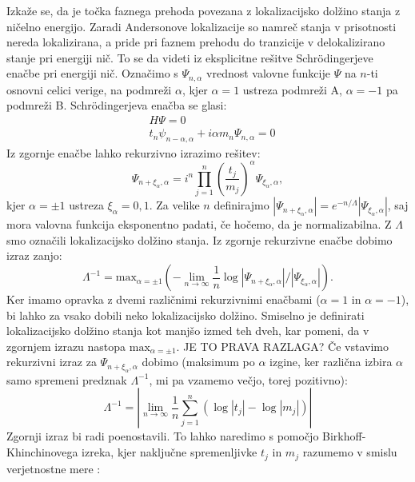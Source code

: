 Izkaže se, da je točka faznega prehoda povezana z lokalizacijsko dolžino stanja z ničelno energijo. Zaradi Andersonove lokalizacije so namreč stanja v prisotnosti nereda lokalizirana, a pride pri faznem prehodu do tranzicije v delokalizirano stanje pri energiji nič.
To se da videti iz eksplicitne rešitve Schrödingerjeve enačbe pri energiji nič.
Označimo s $\Psi_{n, \alpha}$ vrednost valovne funkcije $\Psi$ na $n$-ti osnovni celici verige, na podmreži $\alpha$, kjer $\alpha=1$ ustreza podmreži A, $\alpha=-1$ pa podmreži B.
Schrödingerjeva enačba se glasi:
\begin{align}
&H \Psi = 0 \\
&t_n \psi_{n-\alpha, \alpha} + i \alpha m_n \Psi_{n, \alpha} = 0
\end{align}
Iz zgornje enačbe lahko rekurzivno izrazimo rešitev:
\begin{equation}
\Psi_{n+\xi_\alpha, \alpha} = i^n \prod_{j=1}^n \left( \frac{t_j}{m_j} \right)^\alpha \Psi_{\xi_\alpha,\alpha},
\end{equation}
kjer $\alpha = \pm 1$ ustreza $\xi_\alpha = 0, 1$.
Za velike $n$ definirajmo $|\Psi_{n+\xi_\alpha, \alpha}| = e^{-n/\Lambda } |\Psi_{\xi_\alpha, \alpha}|$, saj mora valovna funkcija eksponentno padati, če hočemo, da je normalizabilna. Z $\Lambda$ smo označili lokalizacijsko dolžino stanja.
Iz zgornje rekurzivne enačbe dobimo izraz zanjo:
\begin{equation}
\Lambda^{-1} = \mathrm{max}_{\alpha = \pm 1} \left( - \lim_{n \to \infty} \frac{1}{n} \log |\Psi_{n+ \xi_\alpha, \alpha}| / |\Psi_{\xi_\alpha, \alpha}| \right).
\end{equation}
Ker imamo opravka z dvemi različnimi rekurzivnimi enačbami ($\alpha=1$ in $\alpha=-1$), bi lahko za vsako dobili neko lokalizacijsko dolžino. Smiselno je definirati lokalizacijsko dolžino stanja kot manjšo izmed teh dveh, kar pomeni, da v zgornjem izrazu nastopa $\mathrm{max}_{\alpha = \pm 1}$. JE TO PRAVA RAZLAGA? 
Če vstavimo rekurzivni izraz za $\Psi_{n+ \xi_\alpha, \alpha}$ dobimo (maksimum po $\alpha$ izgine, ker različna izbira $\alpha$ samo spremeni predznak $\Lambda^{-1}$, mi pa vzamemo večjo, torej pozitivno):
\begin{equation} \label{empiricnalok}
\Lambda^{-1} = \left| \lim_{n \to \infty} \frac{1}{n} \sum_{j=1}^n ( \log |t_j| - \log |m_j| ) \right| 
\end{equation}
Zgornji izraz bi radi poenostavili. 
To lahko naredimo s pomočjo Birkhoff-Khinchinovega izreka, kjer naključne spremenljivke $t_j$ in $m_j$ razumemo v smislu verjetnostne mere \cite{mera}:
